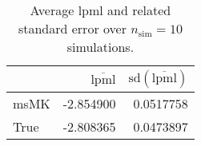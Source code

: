 \begin{table}[H]

\caption{Average lpml and related standard error over $n_{\text{sim}} = 10$ simulations.}
\centering
\begin{tabular}[t]{lrr}
\toprule
  & $\overbar{\text{lpml}}$ & $\text{sd}(\overbar{\text{lpml}})$\\
\midrule
msMK & -2.854900 & 0.0517758\\
True & -2.808365 & 0.0473897\\
\bottomrule
\end{tabular}
\end{table}